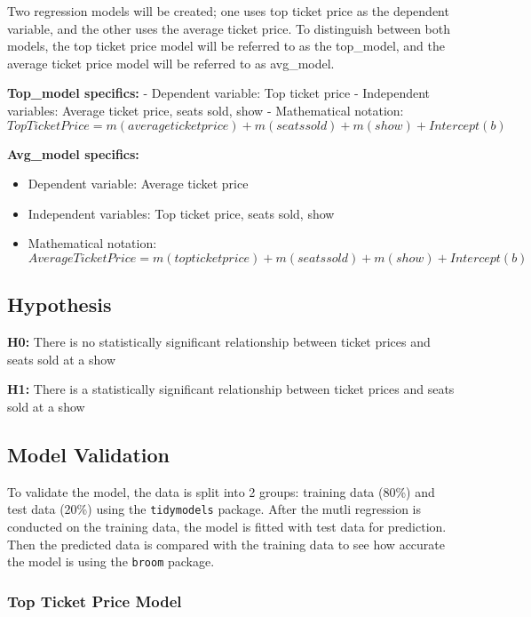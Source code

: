 \documentclass[
]{article}
\providecommand{\tightlist}{%
  \setlength{\itemsep}{0pt}\setlength{\parskip}{0pt}}
\begin{document}
Two regression models will be created; one uses top ticket price as the dependent variable, and the other uses the average ticket price. To distinguish between both models, the top ticket price model will be referred to as the top\_model, and the average ticket price model will be referred to as avg\_model.

\textbf{Top\_model specifics:}
- Dependent variable: Top ticket price
- Independent variables: Average ticket price, seats sold, show
- Mathematical notation:
\[
Top Ticket Price = m (average ticket price) + m (seats sold) + m (show) + Intercept (b)
\]

\textbf{Avg\_model specifics:}

\begin{itemize}
\tightlist
\item
  Dependent variable: Average ticket price
\item
  Independent variables: Top ticket price, seats sold, show
\item
  Mathematical notation:
  \[
  Average Ticket Price = m (top ticket price) + m (seats sold) + m (show) + Intercept (b)
  \]
\end{itemize}

\hypertarget{hypothesis}{%
\subsection{Hypothesis}\label{hypothesis}}

\textbf{H0:} There is no statistically significant relationship between ticket prices and seats sold at a show

\textbf{H1:} There is a statistically significant relationship between ticket prices and seats sold at a show

\hypertarget{model-validation}{%
\subsection{Model Validation}\label{model-validation}}

To validate the model, the data is split into 2 groups: training data (80\%) and test data (20\%) using the \texttt{tidymodels} package. After the mutli regression is conducted on the training data, the model is fitted with test data for prediction. Then the predicted data is compared with the training data to see how accurate the model is using the \texttt{broom} package.

\hypertarget{top-ticket-price-model}{%
\subsubsection{Top Ticket Price Model}\label{top-ticket-price-model}}
\end{document}
